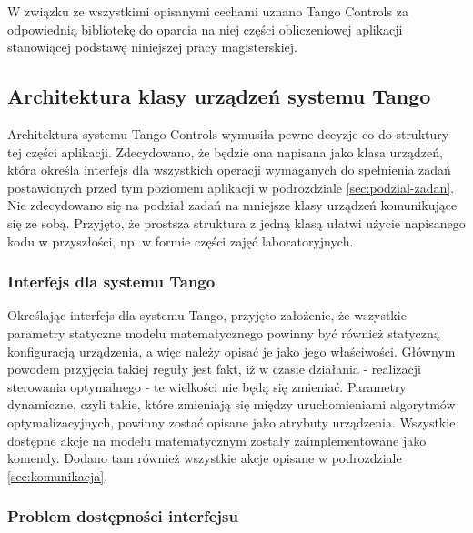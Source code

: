 W związku ze wszystkimi opisanymi cechami uznano Tango Controls za odpowiednią bibliotekę do oparcia na niej części obliczeniowej aplikacji stanowiącej podstawę niniejszej pracy magisterskiej.


\subsection{Architektura klasy urządzeń systemu Tango}
\label{sub:czesc-wyzsza-klasa}

Architektura systemu Tango Controls wymusiła pewne decyzje co do struktury tej części aplikacji. Zdecydowano, że będzie ona napisana jako klasa urządzeń, która określa interfejs dla wszystkich operacji wymaganych do spełnienia zadań postawionych przed tym poziomem aplikacji w podrozdziale \ref{sec:podzial-zadan}. Nie zdecydowano się na podział zadań na mniejsze klasy urządzeń komunikujące się ze sobą. Przyjęto, że prostsza struktura z jedną klasą ułatwi użycie napisanego kodu w przyszłości, np. w formie części zajęć laboratoryjnych.

\subsubsection{Interfejs dla systemu Tango}

Określając interfejs dla systemu Tango, przyjęto założenie, że wszystkie parametry statyczne modelu matematycznego powinny być również statyczną konfiguracją urządzenia, a więc należy opisać je jako jego właściwości. Głównym powodem przyjęcia takiej reguły jest fakt, iż w czasie działania - realizacji sterowania optymalnego - te wielkości nie będą się zmieniać.
Parametry dynamiczne, czyli takie, które zmieniają się między uruchomieniami algorytmów optymalizacyjnych, powinny zostać opisane jako atrybuty urządzenia.
Wszystkie dostępne akcje na modelu matematycznym zostały zaimplementowane jako komendy. Dodano tam również wszystkie akcje opisane w podrozdziale \ref{sec:komunikacja}.


\subsubsection{Problem dostępności interfejsu}



